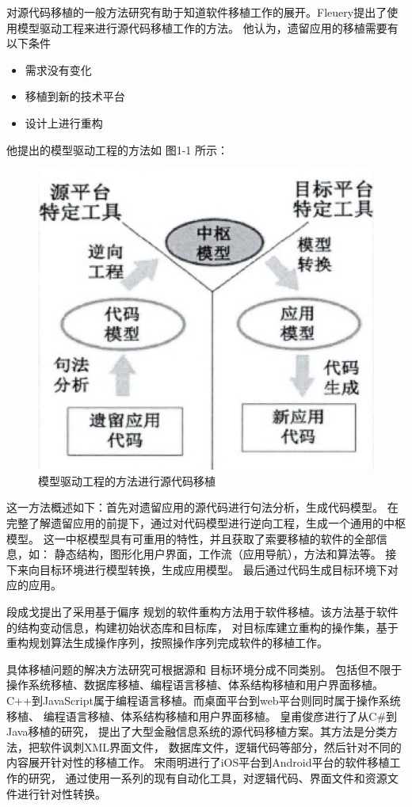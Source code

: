 对源代码移植的一般方法研究有助于知道软件移植工作的展开。Fleuery提出了使用模型驱动工程来进行源代码移植工作的方法。
他认为，遗留应用的移植需要有以下条件

\begin{itemize}
    \item 需求没有变化
    \item 移植到新的技术平台
    \item 设计上进行重构
\end{itemize}

他提出的模型驱动工程的方法如 图1-1 所示：

\begin{figure}[h!] %
    \centering
    \includegraphics[width=200bp]{figure/pic/model-driving-software-porting.png}
    \caption{模型驱动工程的方法进行源代码移植}
    \label{model-driving-software-porting-sample}
\end{figure}

这一方法概述如下：首先对遗留应用的源代码进行句法分析，生成代码模型。
在完整了解遗留应用的前提下，通过对代码模型进行逆向工程，生成一个通用的中枢模型。
这一中枢模型具有可重用的特性，并且获取了索要移植的软件的全部信息，如：
静态结构，图形化用户界面，工作流（应用导航），方法和算法等。
接下来向目标环境进行模型转换，生成应用模型。
最后通过代码生成目标环境下对应的应用。

段成戈提出了采用基于偏序
规划的软件重构方法用于软件移植。该方法基于软件的结构变动信息，构建初始状态库和目标库，
对目标库建立重构的操作集，基于重构规划算法生成操作序列，按照操作序列完成软件的移植工作。

具体移植问题的解决方法研究可根据源和
目标环境分成不同类别。
包括但不限于操作系统移植、数据库移植、编程语言移植、体系结构移植和用户界面移植。
C++到JavaScript属于编程语言移植。而桌面平台到web平台则同时属于操作系统移植、
编程语言移植、体系结构移植和用户界面移植。
皇甫俊彦进行了从C\#到Java移植的研究，
提出了大型金融信息系统的源代码移植方案。其方法是分类方法，把软件讽刺XML界面文件，
数据库文件，逻辑代码等部分，然后针对不同的内容展开针对性的移植工作。
宋雨明进行了iOS平台到Android平台的软件移植工作的研究，
通过使用一系列的现有自动化工具，对逻辑代码、界面文件和资源文件进行针对性转换。

